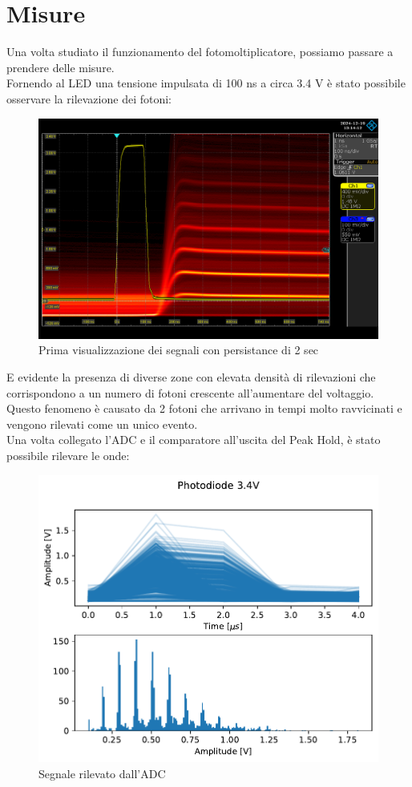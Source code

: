 

\section{Misure}
Una volta studiato il funzionamento del fotomoltiplicatore, possiamo passare a prendere delle misure.\\

Fornendo al LED una tensione impulsata di 100 ns a circa 3.4 V è stato possibile osservare la rilevazione dei fotoni:

\begin{figure}[!h]
    \centering
    \includegraphics[width=0.5\linewidth]{Photomultiplier/assets/SiPm/SiPm.png}
    \caption{Prima visualizzazione dei segnali con persistance di 2 sec}
\end{figure}

E evidente la presenza di diverse zone con elevata densità di rilevazioni che corrispondono a un numero di fotoni crescente all'aumentare del voltaggio. Questo fenomeno è causato da 2 fotoni che arrivano in tempi molto ravvicinati e vengono rilevati come un unico evento.\\
Una volta collegato l'ADC e il comparatore all'uscita del Peak Hold, è stato possibile rilevare le onde:

\begin{figure}[!h]
    \centering
    \includegraphics[width=0.5\linewidth]{Photomultiplier/assets/phot_3.4V.pdf}
    \caption{Segnale rilevato dall'ADC}
\end{figure}

